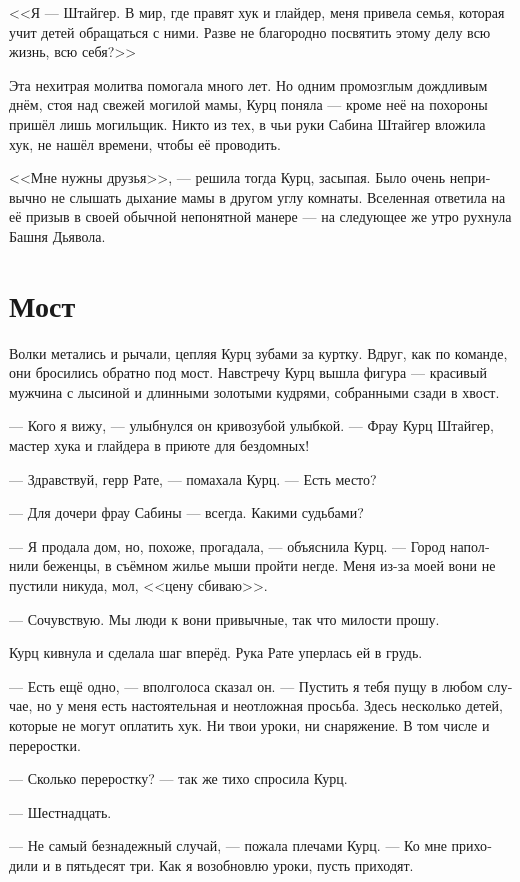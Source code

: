 \documentclass[a4paper,12pt,fleqn]{book}\usepackage{polyglossia}\setdefaultlanguage[babelshorthands=true]{russian}\setotherlanguage{english}\defaultfontfeatures{Ligatures=TeX,Mapping=tex-text}\usepackage{xcolor}\newcommand{\ml}[3]{#2}
\begin{document}
<<Я --- Штайгер.
В мир, где правят хук и глайдер, меня привела семья, которая учит детей обращаться с ними.
Разве не благородно посвятить этому делу всю жизнь, всю себя?>>

Эта нехитрая молитва помогала много лет.
Но одним промозглым дождливым днём, стоя над свежей могилой мамы, Курц поняла --- кроме неё на похороны пришёл лишь могильщик.
Никто из тех, в чьи руки Сабина Штайгер вложила хук, не нашёл времени, чтобы её проводить.

<<Мне нужны друзья>>, --- решила тогда Курц, засыпая.
Было очень непривычно не слышать дыхание мамы в другом углу комнаты.
Вселенная ответила на её призыв в своей обычной непонятной манере --- на следующее же утро рухнула Башня Дьявола.

\section{Мост}

Волки метались и рычали, цепляя Курц зубами за куртку.
Вдруг, как по команде, они бросились обратно под мост.
Навстречу Курц вышла фигура --- красивый мужчина с лысиной и длинными золотыми кудрями, собранными сзади в хвост.

--- Кого я вижу, --- улыбнулся он кривозубой улыбкой.
--- Фрау Курц Штайгер, мастер хука и глайдера в приюте для бездомных!

--- Здравствуй, герр Рате, --- помахала Курц.
--- Есть место?

--- Для дочери фрау Сабины --- всегда.
Какими судьбами?

--- Я продала дом, но, похоже, прогадала, --- объяснила Курц.
--- Город наполнили беженцы, в съёмном жилье мыши пройти негде.
Меня из-за моей вони не пустили никуда, мол, <<цену сбиваю>>.

--- Сочувствую.
Мы люди к вони привычные, так что милости прошу.

Курц кивнула и сделала шаг вперёд.
Рука Рате уперлась ей в грудь.

--- Есть ещё одно, --- вполголоса сказал он.
--- Пустить я тебя пущу в любом случае, но у меня есть настоятельная и неотложная просьба.
Здесь несколько детей, которые не могут оплатить хук.
Ни твои уроки, ни снаряжение.
В том числе и переростки.

--- Сколько переростку? --- так же тихо спросила Курц.

--- Шестнадцать.

--- Не самый безнадежный случай, --- пожала плечами Курц.
--- Ко мне приходили и в пятьдесят три.
Как я возобновлю уроки, пусть приходят.
\end{document}
